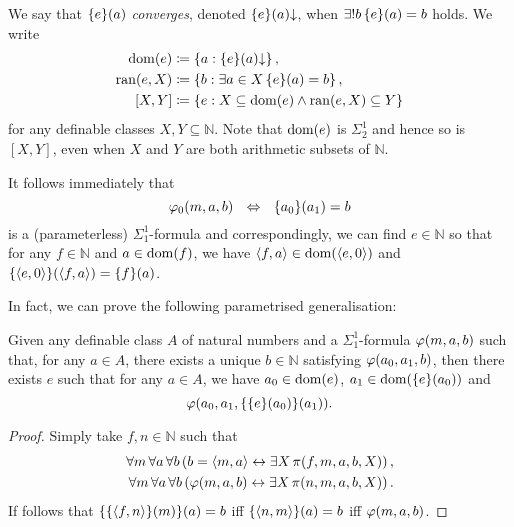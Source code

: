 \documentclass[11pt]{article}
\theoremstyle{plain}
\theoremstyle{definition}
\newcommand{\tuple}[1]{\left\langle #1 \right\rangle}
\DeclareMathOperator{\dom}{dom}
\DeclareMathOperator{\ran}{ran}
\begin{document}
We say that $\mleft\{e\mright\}\mleft(a\mright)$ \emph{converges}, denoted $\mleft\{e\mright\}\mleft(a\mright) {\downarrow}$, when $\exists!b \, \mleft\{e\mright\}\mleft(a\mright) = b$ holds. We write
\begin{align*}
    \dom\mleft(e\mright)    & \coloneqq \left\{a : \mleft\{e\mright\}\mleft(a\mright) {\downarrow}\right\},                           \\
    \ran\mleft(e, X\mright) & \coloneqq \left\{b : \exists a \in X \, \mleft\{e\mright\}\mleft(a\mright) = b\right\},                 \\
    \left[X, Y\right]       & \coloneqq \left\{e : X \subseteq \dom\mleft(e\mright) \land \ran\mleft(e, X\mright) \subseteq Y\right\}
\end{align*}
for any definable classes $X, Y \subseteq \mathbb{N}$. Note that $\dom\mleft(e\mright)$ is $\Sigma^1_2$ and hence so is $\left[X, Y\right]$, even when $X$ and $Y$ are both arithmetic subsets of $\mathbb{N}$.

It follows immediately that
\[\varphi_0\mleft(m, a, b\mright) \ \ \ratio\Leftrightarrow \ \ \mleft\{a_0\mright\}\mleft(a_1\mright) = b\]
is a (parameterless) $\Sigma^1_1$-formula and correspondingly, we can find $e \in \mathbb{N}$ so that for any $f \in \mathbb{N}$ and $a \in \dom\mleft(f\mright)$, we have $\tuple{f, a} \in \dom\mleft(\tuple{e, 0}\mright)$ and $\mleft\{\tuple{e, 0}\mright\}\mleft(\tuple{f, a}\mright) = \mleft\{f\mright\}\mleft(a\mright)$.

In fact, we can prove the following parametrised generalisation:

\begin{proposition}
    \label{prop:sigma11-smn}
    Given any definable class $A$ of natural numbers and a $\Sigma^1_1$-formula $\varphi\mleft(m, a, b\mright)$ such that, for any $a \in A$, there exists a unique $b \in \mathbb{N}$ satisfying $\varphi\mleft(a_0, a_1, b\mright)$, then there exists $e$ such that for any $a \in A$, we have $a_0 \in \dom\mleft(e\mright)$, $a_1 \in \dom\mleft(\mleft\{e\mright\}\mleft(a_0\mright)\mright)$ and
    \[\varphi\mleft(a_0, a_1, \mleft\{\mleft\{e\mright\}\mleft(a_0\mright)\mright\}\mleft(a_1\mright)\mright).\]
\end{proposition}

\begin{proof}
    Simply take $f, n \in \mathbb{N}$ such that
    \begin{align*}
        \forall m \, \forall a \, \forall b \left(b = \tuple{m, a} \leftrightarrow \exists X \, \pi\mleft(f, m, a, b, X\mright)\right), \\
        \forall m \, \forall a \, \forall b \left(\varphi\mleft(m, a, b\mright) \leftrightarrow \exists X \, \pi\mleft(n, m, a, b, X\mright)\right).
    \end{align*}
    If follows that $\mleft\{\mleft\{\tuple{f, n}\mright\}\mleft(m\mright)\mright\}\mleft(a\mright) = b$ iff $\mleft\{\tuple{n, m}\mright\}\mleft(a\mright) = b$ iff $\varphi\mleft(m, a, b\mright)$.
\end{proof}
\end{document}
